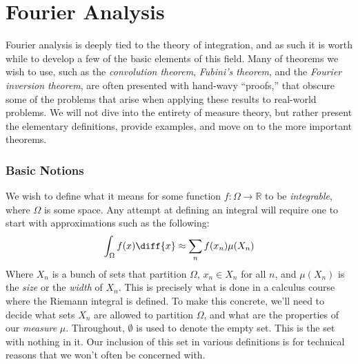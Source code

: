 \chapter{Fourier Analysis}
    Fourier analysis is deeply tied to the theory of integration, and as such
    it is worth while to develop a few of the basic elements of this field.
    Many of theorems we wish to use, such as the \textit{convolution theorem},
    \textit{Fubini's theorem}, and the \textit{Fourier inversion theorem},
    are often presented with hand-wavy ``proofs,'' that obscure some of the
    problems that arise when applying these results to real-world problems. We
    will not dive into the entirety of measure theory, but rather present the
    elementary definitions, provide examples, and move on to the
    more important theorems.
    \subsection{Basic Notions}
        We wish to define what it means for some function
        $f:\Omega\rightarrow\mathbb{R}$ to be \textit{integrable}, where
        $\Omega$ is some space. Any attempt at defining an integral will
        require one to start with approximations such as the following:
        \begin{equation}
            \int_{\Omega}f(x)\diff{x}\approx\sum_{n}f(x_{n})\mu(X_{n})
        \end{equation}
        Where $X_{n}$ is a bunch of sets that partition $\Omega$,
        $x_{n}\in{X}_{n}$ for all $n$, and $\mu(X_{n})$ is the \textit{size} or
        the \textit{width} of $X_{n}$. This is precisely what is done in a
        calculus course where the Riemann integral is defined. To make this
        concrete, we'll need to decide what sets $X_{n}$ are allowed to
        partition $\Omega$, and what are the properties of our
        \textit{measure} $\mu$. Throughout, $\emptyset$ is used to denote
        the empty set. This is the set with nothing in it. Our inclusion of
        this set in various definitions is for technical reasons that we won't
        often be concerned with.
